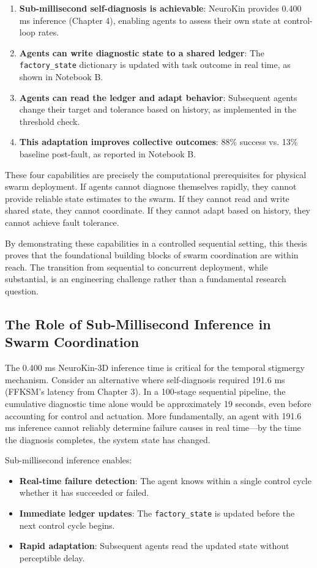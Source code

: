 \documentclass[12pt,a4paper,oneside]{report}
\begin{document}
\begin{enumerate}
    \item \textbf{Sub-millisecond self-diagnosis is achievable}: NeuroKin provides 0.400 ms inference (Chapter 4), enabling agents to assess their own state at control-loop rates.
    \item \textbf{Agents can write diagnostic state to a shared ledger}: The \texttt{factory\_state} dictionary is updated with task outcome in real time, as shown in Notebook B.
    \item \textbf{Agents can read the ledger and adapt behavior}: Subsequent agents change their target and tolerance based on history, as implemented in the threshold check.
    \item \textbf{This adaptation improves collective outcomes}: 88\% success vs. 13\% baseline post-fault, as reported in Notebook B.
\end{enumerate}

These four capabilities are precisely the computational prerequisites for physical swarm deployment. If agents cannot diagnose themselves rapidly, they cannot provide reliable state estimates to the swarm. If they cannot read and write shared state, they cannot coordinate. If they cannot adapt based on history, they cannot achieve fault tolerance.

By demonstrating these capabilities in a controlled sequential setting, this thesis proves that the foundational building blocks of swarm coordination are within reach. The transition from sequential to concurrent deployment, while substantial, is an engineering challenge rather than a fundamental research question.

\subsection{The Role of Sub-Millisecond Inference in Swarm Coordination}

The 0.400 ms NeuroKin-3D inference time is critical for the temporal stigmergy mechanism. Consider an alternative where self-diagnosis required 191.6 ms (FFKSM's latency from Chapter 3). In a 100-stage sequential pipeline, the cumulative diagnostic time alone would be approximately 19 seconds, even before accounting for control and actuation. More fundamentally, an agent with 191.6 ms inference cannot reliably determine failure causes in real time—by the time the diagnosis completes, the system state has changed.

Sub-millisecond inference enables:
\begin{itemize}
    \item \textbf{Real-time failure detection}: The agent knows within a single control cycle whether it has succeeded or failed.
    \item \textbf{Immediate ledger updates}: The \texttt{factory\_state} is updated before the next control cycle begins.
    \item \textbf{Rapid adaptation}: Subsequent agents read the updated state without perceptible delay.
\end{itemize}
\end{document}
